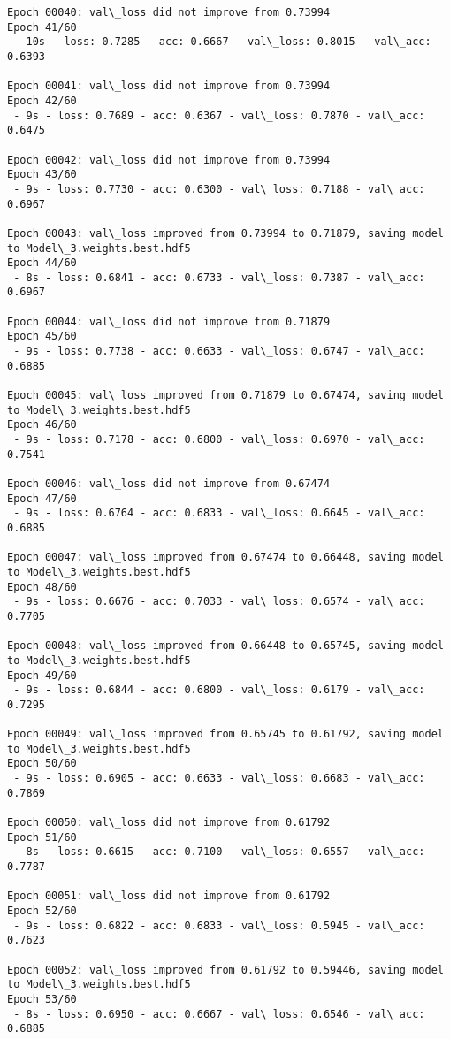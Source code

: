 \documentclass[11pt]{article}
\begin{document}
\begin{Verbatim}[commandchars=\\\{\}]
Epoch 00040: val\_loss did not improve from 0.73994
Epoch 41/60
 - 10s - loss: 0.7285 - acc: 0.6667 - val\_loss: 0.8015 - val\_acc: 0.6393

Epoch 00041: val\_loss did not improve from 0.73994
Epoch 42/60
 - 9s - loss: 0.7689 - acc: 0.6367 - val\_loss: 0.7870 - val\_acc: 0.6475

Epoch 00042: val\_loss did not improve from 0.73994
Epoch 43/60
 - 9s - loss: 0.7730 - acc: 0.6300 - val\_loss: 0.7188 - val\_acc: 0.6967

Epoch 00043: val\_loss improved from 0.73994 to 0.71879, saving model to Model\_3.weights.best.hdf5
Epoch 44/60
 - 8s - loss: 0.6841 - acc: 0.6733 - val\_loss: 0.7387 - val\_acc: 0.6967

Epoch 00044: val\_loss did not improve from 0.71879
Epoch 45/60
 - 9s - loss: 0.7738 - acc: 0.6633 - val\_loss: 0.6747 - val\_acc: 0.6885

Epoch 00045: val\_loss improved from 0.71879 to 0.67474, saving model to Model\_3.weights.best.hdf5
Epoch 46/60
 - 9s - loss: 0.7178 - acc: 0.6800 - val\_loss: 0.6970 - val\_acc: 0.7541

Epoch 00046: val\_loss did not improve from 0.67474
Epoch 47/60
 - 9s - loss: 0.6764 - acc: 0.6833 - val\_loss: 0.6645 - val\_acc: 0.6885

Epoch 00047: val\_loss improved from 0.67474 to 0.66448, saving model to Model\_3.weights.best.hdf5
Epoch 48/60
 - 9s - loss: 0.6676 - acc: 0.7033 - val\_loss: 0.6574 - val\_acc: 0.7705

Epoch 00048: val\_loss improved from 0.66448 to 0.65745, saving model to Model\_3.weights.best.hdf5
Epoch 49/60
 - 9s - loss: 0.6844 - acc: 0.6800 - val\_loss: 0.6179 - val\_acc: 0.7295

Epoch 00049: val\_loss improved from 0.65745 to 0.61792, saving model to Model\_3.weights.best.hdf5
Epoch 50/60
 - 9s - loss: 0.6905 - acc: 0.6633 - val\_loss: 0.6683 - val\_acc: 0.7869

Epoch 00050: val\_loss did not improve from 0.61792
Epoch 51/60
 - 8s - loss: 0.6615 - acc: 0.7100 - val\_loss: 0.6557 - val\_acc: 0.7787

Epoch 00051: val\_loss did not improve from 0.61792
Epoch 52/60
 - 9s - loss: 0.6822 - acc: 0.6833 - val\_loss: 0.5945 - val\_acc: 0.7623

Epoch 00052: val\_loss improved from 0.61792 to 0.59446, saving model to Model\_3.weights.best.hdf5
Epoch 53/60
 - 8s - loss: 0.6950 - acc: 0.6667 - val\_loss: 0.6546 - val\_acc: 0.6885


\end{Verbatim}
\end{document}
